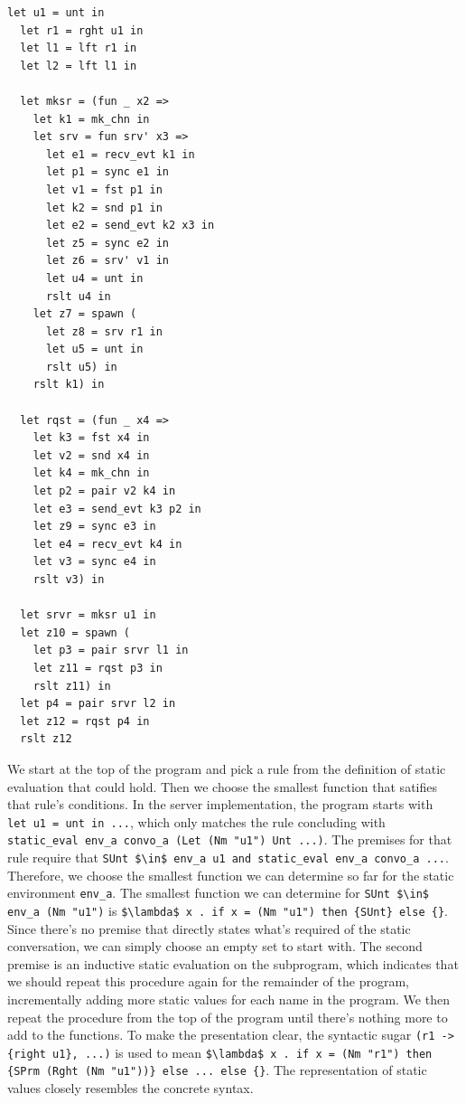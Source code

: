 \documentclass{article}
\begin{document}
\begin{lstlisting}[language=normal_lang, escapechar=\%]
  let u1 = unt in
  let r1 = rght u1 in
  let l1 = lft r1 in
  let l2 = lft l1 in

  let mksr = (fun _ x2 => 
    let k1 = mk_chn in
    let srv = fun srv' x3 =>
      let e1 = recv_evt k1 in
      let p1 = sync e1 in
      let v1 = fst p1 in
      let k2 = snd p1 in 
      let e2 = send_evt k2 x3 in
      let z5 = sync e2 in
      let z6 = srv' v1 in
      let u4 = unt in
      rslt u4 in
    let z7 = spawn (
      let z8 = srv r1 in
      let u5 = unt in
      rslt u5) in
    rslt k1) in

  let rqst = (fun _ x4 =>
    let k3 = fst x4 in
    let v2 = snd x4 in
    let k4 = mk_chn in
    let p2 = pair v2 k4 in
    let e3 = send_evt k3 p2 in
    let z9 = sync e3 in
    let e4 = recv_evt k4 in
    let v3 = sync e4 in
    rslt v3) in

  let srvr = mksr u1 in
  let z10 = spawn ( 
    let p3 = pair srvr l1 in
    let z11 = rqst p3 in
    rslt z11) in
  let p4 = pair srvr l2 in
  let z12 = rqst p4 in
  rslt z12
  \end{lstlisting}


We start at the top of the program and pick a rule from the definition of static evaluation that
could hold. Then we choose the smallest function that satifies that rule's conditions. 
In the server implementation, the program starts with \\
\lstinline[language=normal_lang, mathescape]{let u1 = unt in ...}, which only matches
the rule concluding with \\
\lstinline[language=logic, mathescape]{static_eval env_a convo_a (Let (Nm "u1") Unt ...)}. 
The premises for that rule require that 
\lstinline[language=logic, mathescape]{SUnt $\in$ env_a u1 and static_eval env_a convo_a ...}.\\
Therefore, we choose the smallest function we can determine so far for the static environment
\lstinline{env_a}. The smallest function we can determine for 
\lstinline[language=logic, mathescape]{SUnt $\in$ env_a (Nm "u1")} is 
\lstinline[language=logic, mathescape]|$\lambda$ x . if x = (Nm "u1") then {SUnt} else {}|. \\
Since
there's no premise that directly states what's required of the static conversation, we can
simply choose an empty set to start with. The second premise is an inductive static evaluation on
the subprogram, which indicates that we should repeat this procedure again for the remainder of
the program, incrementally adding more static values for each name in the program.  We then repeat
the procedure from the top of the program until there's nothing more to add to the functions.
To make the presentation clear, the syntactic sugar \lstinline|(r1 -> {right u1}, ...)| is used 
to mean
\lstinline[mathescape]|$\lambda$ x . if x = (Nm "r1") then {SPrm (Rght (Nm "u1"))} else ... else {}|.
The representation of static values closely resembles the concrete syntax.
\end{document}
